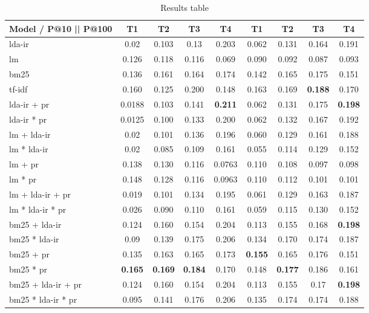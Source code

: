 \begin{table*}[h]
	\centering
	\caption{Results table}
	\begin{tabular}{l|c|c|c|c||c|c|c|c}
		Model / P@10 || P@100 & T1 & T2 & T3 & T4 & T1 & T2 & T3 & T4\\
		\midrule
		\gls{lda}-\gls{ir} & 0.02 & 0.103 & 0.13 & 0.203 & 0.062 & 0.131 & 0.164 & 0.191 \\
		\gls{lm} & 0.126 & 0.118 & 0.116 & 0.069 & 0.090 & 0.092 & 0.087 & 0.093\\
		\gls{bm25} & 0.136 & 0.161 & 0.164 & 0.174 & 0.142 & 0.165 & 0.175 & 0.151\\ 
		\gls{tf-idf} & 0.160 & 0.125 & 0.200 & 0.148 & 0.163 & 0.169 & \textbf{0.188} & 0.170 \\
		\gls{lda}-\gls{ir} + \gls{pr} & 0.0188 & 0.103 & 0.141 & \textbf{0.211} & 0.062 & 0.131 & 0.175 & \textbf{0.198} \\
		\gls{lda}-\gls{ir} * \gls{pr} & 0.0125 & 0.100 & 0.133 & 0.200 & 0.062 & 0.132 & 0.167 & 0.192 \\
		\gls{lm} + \gls{lda}-\gls{ir} & 0.02 & 0.101 & 0.136 & 0.196 & 0.060 & 0.129 & 0.161 & 0.188  \\
		\gls{lm} * \gls{lda}-\gls{ir} & 0.02 & 0.085 & 0.109 & 0.161 & 0.055 & 0.114 & 0.129 & 0.152 \\
		\gls{lm} + \gls{pr} & 0.138 & 0.130 & 0.116 & 0.0763 & 0.110 & 0.108 & 0.097 & 0.098 \\
		\gls{lm} * \gls{pr} & 0.148 & 0.128 & 0.116 & 0.0963 & 0.110 & 0.112 & 0.101 & 0.101 \\
		\gls{lm} + \gls{lda}-\gls{ir} + \gls{pr} & 0.019 & 0.101 & 0.134 & 0.195 & 0.061 & 0.129 & 0.163 & 0.187\\
		\gls{lm} * \gls{lda}-\gls{ir} * \gls{pr} & 0.026 & 0.090 & 0.110 & 0.161 & 0.059 & 0.115 & 0.130 & 0.152\\
		\gls{bm25} + \gls{lda}-\gls{ir} & 0.124 & 0.160 & 0.154 & 0.204 & 0.113 & 0.155 & 0.168 & \textbf{0.198} \\
		\gls{bm25} * \gls{lda}-\gls{ir} & 0.09 & 0.139 & 0.175& 0.206 & 0.134 & 0.170 & 0.174 & 0.187 \\
		\gls{bm25} + \gls{pr} & 0.135 & 0.163 & 0.165 & 0.173 & \textbf{0.155} & 0.165 & 0.176 & 0.151 \\
		\gls{bm25} * \gls{pr} & \textbf{0.165} & \textbf{0.169} & \textbf{0.184} & 0.170 & 0.148 & \textbf{0.177} & 0.186 & 0.161\\
		\gls{bm25} + \gls{lda}-\gls{ir} + \gls{pr} & 0.124 & 0.160 & 0.154 & 0.204 & 0.113 & 0.155 & 0.17 & \textbf{0.198}\\
		\gls{bm25} * \gls{lda}-\gls{ir} * \gls{pr} & 0.095 & 0.141 & 0.176 & 0.206 & 0.135 & 0.174 & 0.174 & 0.188\\
	\end{tabular}
	
	\label{tab:results_precision_at_10}
\end{table*}


